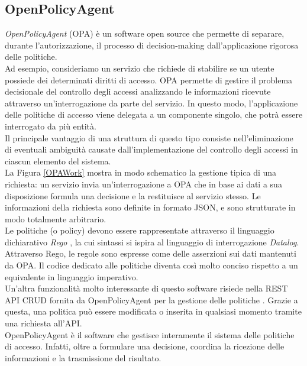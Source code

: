 \subsection{OpenPolicyAgent} \label{opa_intro}
\textit{OpenPolicyAgent} (OPA) \cite{opa_bib} è un software open source che permette di separare, durante l'autorizzazione, il processo di
 decision-making  dall'applicazione rigorosa delle politiche.
\\ Ad esempio, consideriamo un servizio che richiede di stabilire se un utente possiede dei determinati diritti di accesso.
OPA permette di gestire il problema decisionale del controllo degli accessi analizzando le informazioni ricevute attraverso un'interrogazione da parte del servizio. 
In questo modo, l'applicazione delle politiche di accesso viene delegata a un componente singolo, che potrà essere interrogato da più 
entità. \\
Il principale vantaggio di una struttura di questo tipo consiste nell'eliminazione di eventuali ambiguità
 causate dall'implementazione del controllo degli accessi in ciascun elemento del sistema. 
\\La Figura \ref*{OPAWork} mostra in modo schematico la gestione tipica di una richiesta: un servizio invia un'interrogazione
 a OPA che in base ai dati a sua disposizione formula una decisione e la restituisce al servizio stesso. 
Le informazioni della richiesta sono definite in formato JSON, e sono strutturate in modo totalmente arbitrario. 
\\ Le politiche (o policy) devono essere rappresentate attraverso il linguaggio dichiarativo 
\textit{Rego} \cite{rego_doc}, la cui sintassi si ispira al linguaggio 
di interrogazione \textit{Datalog}. 
Attraverso Rego, le regole sono espresse come delle asserzioni sui dati mantenuti da OPA.
Il codice dedicato alle politiche diventa così molto conciso rispetto a un equivalente in 
linguaggio imperativo. 
\\ Un'altra funzionalità molto interessante di questo software risiede nella REST API CRUD fornita da OpenPolicyAgent per la gestione delle politiche \cite{opa_api}. Grazie a questa, una politica può essere modificata o inserita 
in qualsiasi momento tramite una richiesta all'API. 
\\ OpenPolicyAgent è il software che gestisce interamente il sistema delle politiche di accesso. Infatti, oltre a formulare una decisione, 
coordina la ricezione delle informazioni e la trasmissione del risultato.  


